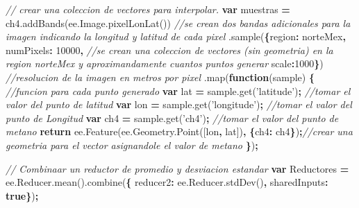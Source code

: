 \documentclass[
]{article}
\newenvironment{Shaded}{\begin{snugshade}}{\end{snugshade}}
\newcommand{\AttributeTok}[1]{\textcolor[rgb]{0.77,0.63,0.00}{#1}}
\newcommand{\CommentTok}[1]{\textcolor[rgb]{0.56,0.35,0.01}{\textit{#1}}}
\newcommand{\ControlFlowTok}[1]{\textcolor[rgb]{0.13,0.29,0.53}{\textbf{#1}}}
\newcommand{\DataTypeTok}[1]{\textcolor[rgb]{0.13,0.29,0.53}{#1}}
\newcommand{\DecValTok}[1]{\textcolor[rgb]{0.00,0.00,0.81}{#1}}
\newcommand{\KeywordTok}[1]{\textcolor[rgb]{0.13,0.29,0.53}{\textbf{#1}}}
\newcommand{\NormalTok}[1]{#1}
\newcommand{\OperatorTok}[1]{\textcolor[rgb]{0.81,0.36,0.00}{\textbf{#1}}}
\newcommand{\StringTok}[1]{\textcolor[rgb]{0.31,0.60,0.02}{#1}}
\newcommand{\VariableTok}[1]{\textcolor[rgb]{0.00,0.00,0.00}{#1}}
\begin{document}
\begin{Shaded}
\begin{Highlighting}[]
\CommentTok{// crear una coleccion de vectores para interpolar.}
\KeywordTok{var}\NormalTok{ muestras }\OperatorTok{=} \VariableTok{ch4}\NormalTok{.}\AttributeTok{addBands}\NormalTok{(}\VariableTok{ee}\NormalTok{.}\VariableTok{Image}\NormalTok{.}\AttributeTok{pixelLonLat}\NormalTok{()) }\CommentTok{//se crean dos bandas adicionales para la imagen indicando la longitud y latitud de cada pixel }
\NormalTok{  .}\AttributeTok{sample}\NormalTok{(}\OperatorTok{\{}\DataTypeTok{region}\OperatorTok{:}\NormalTok{ norteMex}\OperatorTok{,} \DataTypeTok{numPixels}\OperatorTok{:} \DecValTok{10000}\OperatorTok{,} \CommentTok{//se crean una coleccion de vectores (sin geometria) en la region norteMex y aproximandamente cuantos puntos generar}
    \DataTypeTok{scale}\OperatorTok{:}\DecValTok{1000}\OperatorTok{\}}\NormalTok{) }\CommentTok{//resolucion de la imagen en metros por pixel}
\NormalTok{  .}\AttributeTok{map}\NormalTok{(}\KeywordTok{function}\NormalTok{(sample) }\OperatorTok{\{} \CommentTok{//funcion para cada punto generado}
    \KeywordTok{var}\NormalTok{ lat }\OperatorTok{=} \VariableTok{sample}\NormalTok{.}\AttributeTok{get}\NormalTok{(}\StringTok{'latitude'}\NormalTok{)}\OperatorTok{;} \CommentTok{//tomar el valor del punto de latitud}
    \KeywordTok{var}\NormalTok{ lon }\OperatorTok{=} \VariableTok{sample}\NormalTok{.}\AttributeTok{get}\NormalTok{(}\StringTok{'longitude'}\NormalTok{)}\OperatorTok{;} \CommentTok{//tomar el valor del punto de Longitud}
    \KeywordTok{var}\NormalTok{ ch4 }\OperatorTok{=} \VariableTok{sample}\NormalTok{.}\AttributeTok{get}\NormalTok{(}\StringTok{'ch4'}\NormalTok{)}\OperatorTok{;} \CommentTok{//tomar el valor del punto de metano}
    \ControlFlowTok{return} \VariableTok{ee}\NormalTok{.}\AttributeTok{Feature}\NormalTok{(}\VariableTok{ee}\NormalTok{.}\VariableTok{Geometry}\NormalTok{.}\AttributeTok{Point}\NormalTok{([lon}\OperatorTok{,}\NormalTok{ lat])}\OperatorTok{,} \OperatorTok{\{}\DataTypeTok{ch4}\OperatorTok{:}\NormalTok{ ch4}\OperatorTok{\}}\NormalTok{)}\OperatorTok{;}\CommentTok{//crear una geometria para el vector asignandole el valor de metano}
  \OperatorTok{\}}\NormalTok{)}\OperatorTok{;}

\CommentTok{// Combinaar un reductor de promedio y desviacion estandar}
\KeywordTok{var}\NormalTok{ Reductores }\OperatorTok{=} \VariableTok{ee}\NormalTok{.}\VariableTok{Reducer}\NormalTok{.}\AttributeTok{mean}\NormalTok{().}\AttributeTok{combine}\NormalTok{(}\OperatorTok{\{}
  \DataTypeTok{reducer2}\OperatorTok{:} \VariableTok{ee}\NormalTok{.}\VariableTok{Reducer}\NormalTok{.}\AttributeTok{stdDev}\NormalTok{()}\OperatorTok{,}
  \DataTypeTok{sharedInputs}\OperatorTok{:} \KeywordTok{true}\OperatorTok{\}}\NormalTok{)}\OperatorTok{;}


\end{Highlighting}
\end{Shaded}
\end{document}
